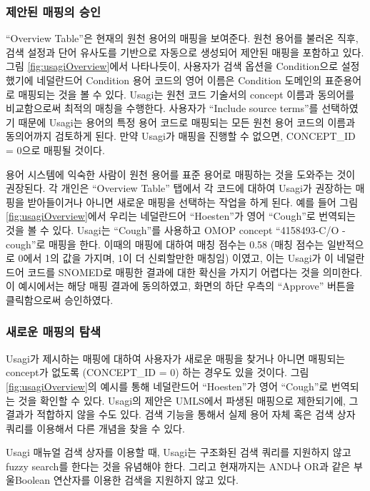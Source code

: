 \documentclass[10.5pt]{book}
\theoremstyle{definition}
\theoremstyle{definition}
\theoremstyle{definition}
\theoremstyle{remark}
\begin{document}
\subsubsection*{제안된 매핑의 승인}\label{--}

``Overview Table''은 현재의 원천 용어의 매핑을 보여준다. 원천 용어를
불러온 직후, 검색 설정과 단어 유사도를 기반으로 자동으로 생성되어 제안된
매핑을 포함하고 있다. 그림 \ref{fig:usagiOverview}에서 나타나듯이,
사용자가 검색 옵션을 Condition으로 설정했기에 네덜란드어 Condition 용어
코드의 영어 이름은 Condition 도메인의 표준용어로 매핑되는 것을 볼 수
있다. Usagi는 원천 코드 기술서의 concept 이름과 동의어를 비교함으로써
최적의 매칭을 수행한다. 사용자가 ``Include source terms''를 선택하였기
때문에 Usagi는 용어의 특정 용어 코드로 매핑되는 모든 원천 용어 코드의
이름과 동의어까지 검토하게 된다. 만약 Usagi가 매핑을 진행할 수 없으면,
CONCEPT\_ID = 0으로 매핑될 것이다.

용어 시스템에 익숙한 사람이 원천 용어를 표준 용어로 매핑하는 것을
도와주는 것이 권장된다. 각 개인은 ``Overview Table'' 탭에서 각 코드에
대하여 Usagi가 권장하는 매핑을 받아들이거나 아니면 새로운 매핑을
선택하는 작업을 하게 된다. 예를 들어 그림 \ref{fig:usagiOverview}에서
우리는 네덜란드어 ``Hoesten''가 영어 ``Cough''로 번역되는 것을 볼 수
있다. Usagi는 ``Cough''를 사용하고 OMOP concept ``4158493-C/O -
cough''로 매핑을 한다. 이때의 매핑에 대하여 매칭 점수는 0.58 (매칭
점수는 일반적으로 0에서 1의 값을 가지며, 1이 더 신뢰할만한 매칭임)
이였고, 이는 Usagi가 이 네덜란드어 코드를 SNOMED로 매핑한 결과에 대한
확신을 가지기 어렵다는 것을 의미한다. 이 예시에서는 해당 매핑 결과에
동의하였고, 화면의 하단 우측의 ``Approve'' 버튼을 클릭함으로써
승인하였다.

\subsubsection*{새로운 매핑의 탐색}\label{--}

Usagi가 제시하는 매핑에 대하여 사용자가 새로운 매핑을 찾거나 아니면
매핑되는 concept가 없도록 (CONCEPT\_ID = 0) 하는 경우도 있을 것이다.
그림 \ref{fig:usagiOverview}의 예시를 통해 네덜란드어 ``Hoesten''가 영어
``Cough''로 번역되는 것을 확인할 수 있다. Usagi의 제안은 UMLS에서 파생된
매핑으로 제한되기에, 그 결과가 적합하지 않을 수도 있다. 검색 기능을
통해서 실제 용어 자체 혹은 검색 상자 쿼리를 이용해서 다른 개념을 찾을 수
있다.

Usagi 매뉴얼 검색 상자를 이용할 때, Usagi는 구조화된 검색 쿼리를
지원하지 않고 fuzzy search를 한다는 것을 유념해야 한다. 그리고
현재까지는 AND나 OR과 같은 부울Boolean 연산자를 이용한 검색을 지원하지
않고 있다.
\end{document}

